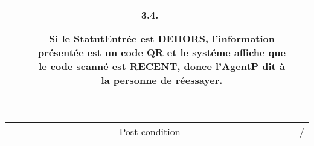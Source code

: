 \begin{tabular}{ |c|p{12cm}| }
\begin{description}
        \item[3.4.] Si le StatutEntrée est DEHORS, l'information présentée est un code QR et le systéme affiche que le code scanné est RECENT, donce l'AgentP dit à la personne de réessayer.
    \end{description} \\
    \hline
    Post-condition & / \\
    \hline
\end{tabular}